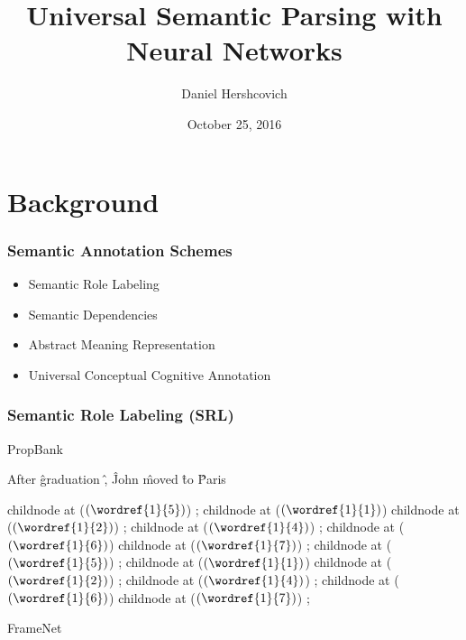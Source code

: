 \documentclass[t]{beamer}
\begin{document}
\title[]{Universal Semantic Parsing with Neural Networks}
\author{Daniel Hershcovich}
\date{October 25, 2016}

\begin{frame}
\titlepage
\end{frame}


\section{Background}

\begin{frame}
\frametitle{Semantic Annotation Schemes}
\begin{itemize}
 \item Semantic Role Labeling
 \item Semantic Dependencies
 \item Abstract Meaning Representation
 \item Universal Conceptual Cognitive Annotation
\end{itemize}
\end{frame}

\begin{frame}
\frametitle{Semantic Role Labeling (SRL)}
\centering
\vspace*{\fill}
{\color{blue} PropBank}
\vspace*{\fill}

\begin{dependency}
	\begin{deptext}[column sep=1.5em,ampersand replacement=\^]
	After \^ graduation \^ , \^ John \^ moved \^ to \^ Paris \\
	\end{deptext}
	child{node at ($(\wordref{1}{5})$) {}};
	child{node at ($(\wordref{1}{1})$) {}}
	child{node at ($(\wordref{1}{2})$) {}};
	child{node at ($(\wordref{1}{4})$) {}};
	child{node at ($(\wordref{1}{6})$) {}}
	child{node at ($(\wordref{1}{7})$) {}};
	child{node at ($(\wordref{1}{5})$) {}};
	child{node at ($(\wordref{1}{1})$) {}}
	child{node at ($(\wordref{1}{2})$) {}};
	child{node at ($(\wordref{1}{4})$) {}};
	child{node at ($(\wordref{1}{6})$) {}}
	child{node at ($(\wordref{1}{7})$) {}};
\end{dependency}

\vspace*{\fill}
{\color{red} FrameNet}
\end{frame}
\end{document}

